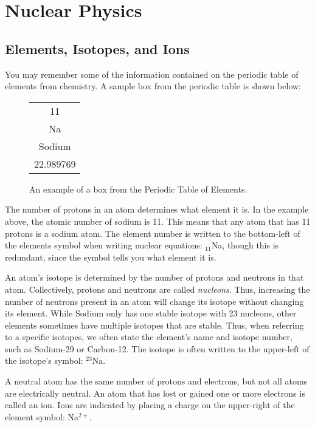 \chapter{Nuclear Physics}

\section{Elements, Isotopes, and Ions}    
You may remember some of the information contained on the periodic table of elements from chemistry.  A sample box from the periodic table is shown below: 

\begin{figure}[h]
	\begin{center}
	\begin{tabular}{|c| }
		\hline
		\color{red}11\color{black}\\
		\huge{Na}\\
		Sodium\\
		\color{blue}22.989769\color{black}\\
		\hline
	\end{tabular}
\caption{An example of a box from the Periodic Table of Elements.}
	\end{center}
\end{figure}

The number of protons in an atom determines what element it is.  In the example above, the atomic number of sodium is \color{red}11\color{black}.  This means that any atom that has 11 protons is a sodium atom.  The element number is written to the bottom-left of the elements symbol when writing nuclear equations: $_{11}$Na, though this is redundant, since the symbol tells you what element it is.

An atom's isotope is determined by the number of protons and neutrons in that atom.  Collectively, protons and neutrons are called \textit{nucleons}.  Thus, increasing the number of neutrons present in an atom will change its isotope without changing its element.  While Sodium only has one stable isotope with 23 nucleons, other elements sometimes have multiple isotopes that are stable.  Thus, when referring to a specific isotopes, we often state the element's name and isotope number, such as Sodium-29 or Carbon-12.  The isotope is often written to the upper-left of the isotope's symbol: $^{23}$Na.    

A neutral atom has the same number of protons and electrons, but not all atoms are electrically neutral.  An atom that has lost or gained one or more electrons is called an ion.  Ions are indicated by placing a charge on the upper-right of the element symbol: Na$^{2+}$.

